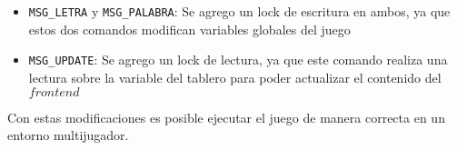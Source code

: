 \begin{itemize}
	\item \texttt{MSG\_LETRA} y \texttt{MSG\_PALABRA}: Se agrego un lock de escritura en ambos, ya que estos dos comandos modifican variables globales del juego
	\item \texttt{MSG\_UPDATE}: Se agrego un lock de lectura, ya que este comando realiza una lectura sobre la variable del tablero para poder actualizar el contenido del $frontend$
\end{itemize}

Con estas modificaciones es posible ejecutar el juego de manera correcta en un entorno multijugador.